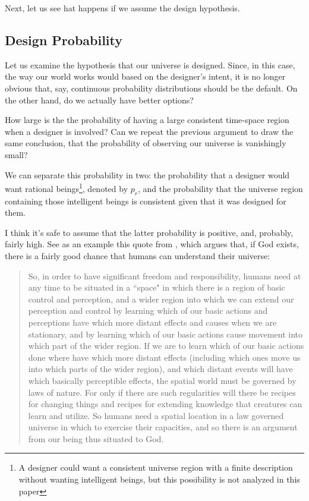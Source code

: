 \documentclass[a4paper
,draft
]{article}
\newcommand{\ghilimele}[1]{``#1"}
\begin{document}
Next, let us see hat happens if we assume the design hypothesis.

\subsection{Design Probability}
\label{sec:design-probability}

Let us examine the hypothesis that our universe is designed.
Since, in this case, the way our world works would based
on the designer's intent,
it is no longer obvious that, say, continuous probability distributions
should be the default.
On the other hand, do we actually have better options?

How large is the the probability of having
a large consistent time-space region when a designer is involved?
Can we repeat the previous argument to draw the same conclusion, that
the probability of observing our universe is vanishingly small?

We can separate this probability in two: the probability that a designer
would want rational beings\footnote{A designer could want a consistent universe
region with a finite
description without wanting intelligent beings, but this possibility is not
analyzed in this paper}, denoted by $p_r$, and
the probability that the universe region containing
those intelligent beings is consistent
given that it was designed for them.

I think it's safe to assume that the latter probability is positive,
and, probably, fairly high. See as an example this quote from
\textcite{Swinburne2003}, which argues that, if God exists,
there is a fairly good chance that humans can understand their universe:

\begin{quote}
  So, in order to have significant freedom and responsibility, humans need
  at any time to be situated in a \ghilimele{space} in which there is a
  region of basic control and perception, and a wider region into which
  we can extend our perception and control by learning which of our
  basic actions and perceptions have which more distant effects and causes
  when we are stationary, and by learning which of our basic actions cause
  movement into which part of the wider region.
  If we are to learn which of our basic actions done where have which
  more distant effects (including which ones move us into which parts
  of the wider region), and which distant events will have which basically
  perceptible effects, the spatial world must be governed by laws of nature.
  For only if there are such regularities will there be recipes for changing
  things and recipes for extending knowledge that creatures can learn and
  utilize.
  So humans need a spatial location in a law governed universe in which to
  exercise their capacities, and so there is an argument from our being thus
  situated to God.
\end{quote}
\end{document}
